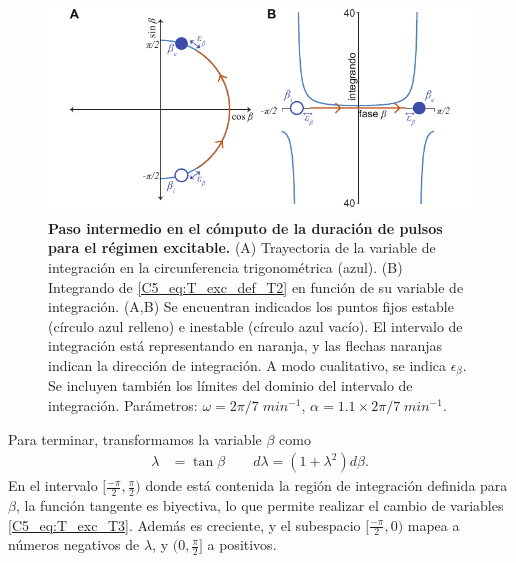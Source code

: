 { \begin{figure}
    \centering
    \includegraphics[width=1\columnwidth]{figures/chapter5/C5_T_exc_T2.pdf} 
    \caption{\textbf{Paso intermedio en el cómputo de la duración de pulsos para el régimen excitable.} (A) Trayectoria de la variable de integración en la circunferencia trigonométrica (azul). (B) Integrando de \ref{C5_eq:T_exc_def_T2} en función de su variable de integración. (A,B) Se encuentran indicados los puntos fijos estable \xxe (círculo azul relleno) e inestable \xxi (círculo azul vacío). El intervalo de integración está representando en naranja, y  las flechas naranjas indican la dirección de integración. A modo cualitativo, se indica $\epsilon_\beta$. Se incluyen también los límites del dominio del intervalo de integración. Parámetros: $\omega=2\pi/7\;min^{-1}$, $\alpha = 1.1 \times 2\pi/7\;min^{-1}$.}
    \label{C5_fig:T_exc_T2}
\end{figure}

Para terminar, transformamos la variable $\beta$ como
\begin{align}
    \lambda &= \tan{\beta} \qquad
    d\lambda = (1+\lambda^2) d\beta. 
    \label{C5_eq:T_exc_T3}
\end{align}
En el intervalo $[\frac{-\pi}{2},\frac{\pi}{2})$ donde está contenida la región de integración definida para $\beta$, la función tangente es biyectiva, lo que permite realizar el cambio de variables \ref{C5_eq:T_exc_T3}. Además es creciente, y el subespacio $[\frac{-\pi}{2},0)$ mapea a números negativos de $\lambda$, y $(0,\frac{\pi}{2}]$ a positivos. 


}
